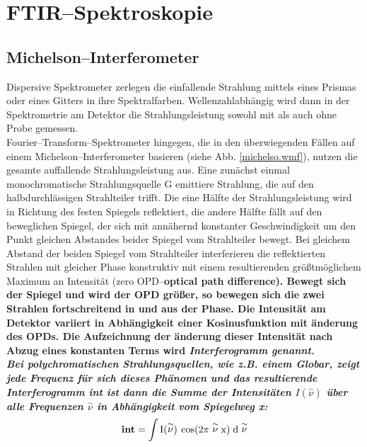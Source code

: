 \section{\label{ftir}FTIR--Spektroskopie}

\subsection{\label{spektrometertypen}Michelson--Interferometer}

Dispersive Spektrometer zerlegen die einfallende Strahlung mittels
eines Prismas oder eines Gitters in ihre Spektralfarben.
Wellenzahlabhängig wird dann in der Spektrometrie am Detektor die
Strahlungsleistung sowohl mit als auch ohne Probe gemessen.\\


Fourier--Transform--Spektrometer hingegen, die in den
überwiegenden Fällen auf einem
Mi\-chel\-son--\-In\-ter\-fe\-ro\-me\-ter basieren (siehe Abb.
\ref{michelso.wmf}), nutzen die gesamte auffallende
Strahlungsleistung aus. Eine zunächst einmal monochromatische
Strahlungsquelle G emittiere Strahlung, die auf den
halbdurchlässigen Strahlteiler trifft. Die eine Hälfte der
Strahlungsleistung wird in Richtung des festen Spiegels
reflektiert, die andere Hälfte fällt auf den beweglichen Spiegel,
der sich mit annähernd konstanter Geschwindigkeit um den Punkt
gleichen Abstandes beider Spiegel vom Strahlteiler bewegt. Bei
gleichem Abstand der beiden Spiegel vom Strahlteiler interferieren
die reflektierten Strahlen mit gleicher Phase konstruktiv mit
einem resultierenden grö{\ss}tmöglichem Maximum an Intensität (zero
OPD--\bf o\rm ptical \bf p\rm ath \bf d\rm ifference). Bewegt sich
der Spiegel und wird der OPD grö{\ss}er, so bewegen sich die zwei
Strahlen fortschreitend in und aus der Phase. Die Intensität am
Detektor variiert in Abhängigkeit einer Kosinusfunktion mit
änderung des OPDs. Die Aufzeichnung der änderung dieser Intensität
nach Abzug eines konstanten Terms wird \it Interferogramm \rm
genannt.\\

Bei polychromatischen Strahlungsquellen, wie z.B. einem Globar,
zeigt jede Frequenz für sich dieses Phänomen und das resultierende
Interferogramm \bf int \rm ist dann die Summe der Intensitäten
$I(\stackrel{\sim}{\nu})$ über alle Frequenzen
$\stackrel{\sim}{\nu}$ in Abhängigkeit vom Spiegelweg x:
\begin{equation}\label{eqint}
  \bf int\rm = \int I(\stackrel{\sim}{\nu})\: \cos (2\pi \stackrel{\sim}{\nu}
  x)\;
  \text{d}\stackrel{\sim}{\nu}
\end{equation}

